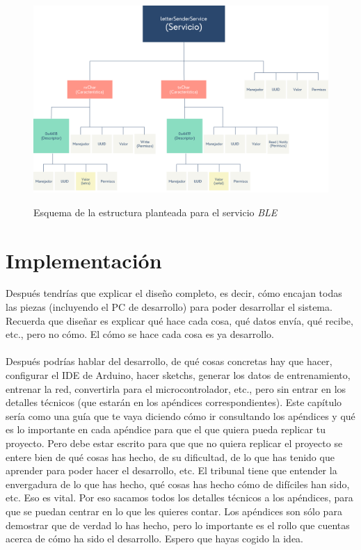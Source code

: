 \begin{figure}[h]
    \centering
    \includegraphics[width=1\textwidth]{capturas/BleLetterSenderService.png}\\[-0,40cm]
    \caption{Esquema de la estructura planteada para el servicio \textit{BLE}}
\end{figure}

\section{Implementación}
{\color{red} Después tendrías que explicar el diseño completo, es decir, cómo
encajan todas las piezas (incluyendo el PC de desarrollo) para poder
desarrollar el sistema. Recuerda que diseñar es explicar qué hace
cada cosa, qué datos envía, qué recibe, etc., pero no cómo. El
cómo se hace cada cosa es ya desarrollo.}\\~\\
{\color{red}Después podrías hablar del desarrollo, de qué cosas concretas hay
que hacer, configurar el IDE de Arduino, hacer sketchs, generar los
datos de entrenamiento, entrenar la red, convertirla para el
microcontrolador, etc., pero sin entrar en los detalles técnicos (que
estarán en los apéndices correspondientes). Este capítulo sería
como una guía que te vaya diciendo cómo ir consultando los
apéndices y qué es lo importante en cada apéndice para que el que
quiera pueda replicar tu proyecto. Pero debe estar escrito para que
que no quiera replicar el proyecto se entere bien de qué cosas has
hecho, de su dificultad, de lo que has tenido que aprender para poder
hacer el desarrollo, etc. El tribunal tiene que entender la
envergadura de lo que has hecho, qué cosas has hecho cómo de
difíciles han sido, etc. Eso es vital. Por eso sacamos todos los
detalles técnicos a los apéndices, para que se puedan centrar en lo
que les quieres contar. Los apéndices son sólo para demostrar que de
verdad lo has hecho, pero lo importante es el rollo que cuentas acerca
de cómo ha sido el desarrollo. Espero que hayas cogido la idea.}
